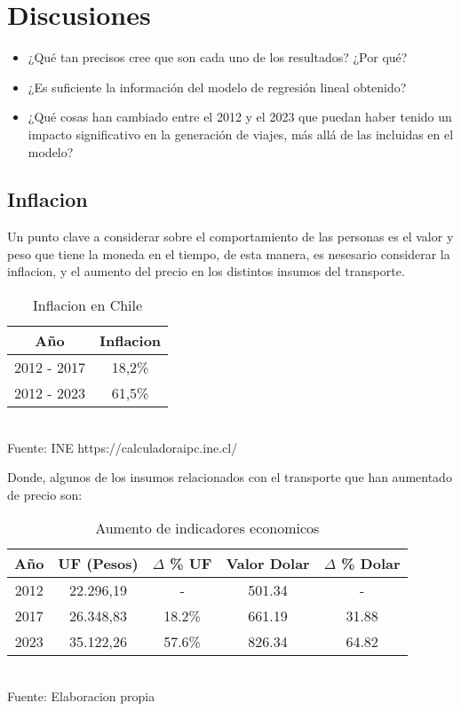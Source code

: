 \documentclass[12pt]{article} %
\begin{document}
\section{Discusiones}

\begin{itemize}
    \item ¿Qué tan precisos cree que son cada uno de los resultados? ¿Por qué?
    \item ¿Es suficiente la información del modelo de regresión lineal obtenido?
    \item ¿Qué cosas han cambiado entre el 2012 y el 2023 que puedan haber tenido un impacto significativo en la generación de viajes, más allá de las incluidas en el modelo?
\end{itemize}

\subsection{Inflacion}

Un punto clave a considerar sobre el comportamiento de las personas es el valor y peso que tiene la moneda en el tiempo, de esta manera, es nesesario considerar la inflacion, y el aumento del precio en los distintos insumos del transporte.

\begin{table}[H]
    \centering
    \caption{Inflacion en Chile}
    \vspace{0.2cm}
    \begin{tabular}{|c|c|}
        \hline
        Año & Inflacion \\
        \hline
        2012 - 2017 & 18,2\% \\
        2012 - 2023 & 61,5\% \\
        \hline
    \end{tabular}
    \vspace{0.2cm}
    \\Fuente: INE https://calculadoraipc.ine.cl/
\end{table}

Donde, algunos de los insumos relacionados con el transporte que han aumentado de precio son:

\begin{table}[H]
    \centering
    \caption{Aumento de indicadores economicos}
    \vspace{0.2cm}
    \begin{tabular}{|c|c|c|c|c|}
        \hline
        Año & UF (Pesos) & $\Delta$ \% UF & Valor Dolar & $\Delta$ \% Dolar\\
        \hline
        2012 & 22.296,19 & - & 501.34 & - \\
        2017 & 26.348,83 & 18.2\% & 661.19 & 31.88 \\
        2023 & 35.122,26 & 57.6\% & 826.34 & 64.82 \\
        \hline
    \end{tabular}
    \vspace{0.2cm}
    \\Fuente: Elaboracion propia
\end{table}
\end{document}
